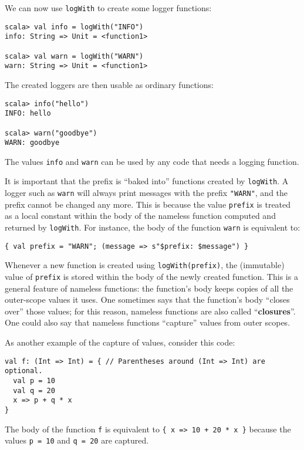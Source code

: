 We can now use \lstinline!logWith! to create some logger functions:
\begin{lstlisting}
scala> val info = logWith("INFO")
info: String => Unit = <function1>

scala> val warn = logWith("WARN")
warn: String => Unit = <function1>
\end{lstlisting}
The created loggers are then usable as ordinary functions:
\begin{lstlisting}
scala> info("hello")
INFO: hello

scala> warn("goodbye")
WARN: goodbye
\end{lstlisting}
The values \lstinline!info! and \lstinline!warn! can be used by
any code that needs a logging function.

It is important that the prefix is \textsf{``}baked into\textsf{''} functions created
by \lstinline!logWith!. A logger such as \lstinline!warn! will always
print messages with the prefix \lstinline!"WARN"!, and the prefix
cannot be changed any more. This is because the value \lstinline!prefix!
is treated as a local constant within the body of the nameless function
computed and returned by \lstinline!logWith!. For instance, the body
of the function \lstinline!warn! is equivalent to:
\begin{lstlisting}
{ val prefix = "WARN"; (message => s"$prefix: $message") }
\end{lstlisting}
Whenever a new function is created using \lstinline!logWith(prefix)!,
the (immutable) value of \lstinline!prefix! is stored within the
body of the newly created function. This is a general feature of nameless
functions: the function\textsf{'}s body keeps copies of all the outer-scope
values it uses. One sometimes says that the function\textsf{'}s body \textsf{``}closes
over\textsf{''} those values; for this reason, nameless functions are also
called \textsf{``}\textbf{closures}\textsf{''}. One could also  say
that nameless functions \textsf{``}capture\textsf{''} values from outer scopes.

As another example of the capture of values, consider this code:
\begin{lstlisting}
val f: (Int => Int) = { // Parentheses around (Int => Int) are optional.
  val p = 10
  val q = 20
  x => p + q * x
}
\end{lstlisting}
The body of the function \lstinline!f! is equivalent to \lstinline!{ x => 10 + 20 * x }!
because the values \lstinline!p = 10! and \lstinline!q = 20! are
captured. 

